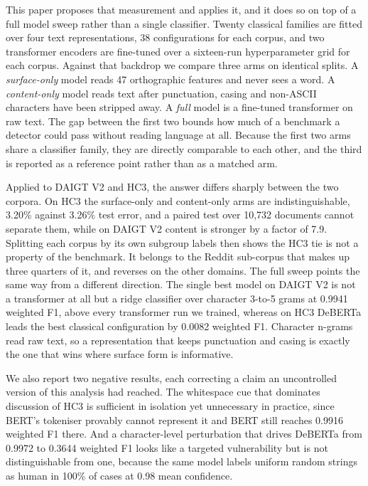 \documentclass[conference,a4paper]{IEEEtran}
\begin{document}
This paper proposes that measurement and applies it, and it does so on top of a full model sweep rather than a single classifier. Twenty classical families are fitted over four text representations, 38 configurations for each corpus, and two transformer encoders are fine-tuned over a sixteen-run hyperparameter grid for each corpus. Against that backdrop we compare three arms on identical splits. A \emph{surface-only} model reads 47 orthographic features and never sees a word. A \emph{content-only} model reads text after punctuation, casing and non-ASCII characters have been stripped away. A \emph{full} model is a fine-tuned transformer on raw text. The gap between the first two bounds how much of a benchmark a detector could pass without reading language at all. Because the first two arms share a classifier family, they are directly comparable to each other, and the third is reported as a reference point rather than as a matched arm.

Applied to DAIGT V2 and HC3, the answer differs sharply between the two corpora. On HC3 the surface-only and content-only arms are indistinguishable, 3.20\% against 3.26\% test error, and a paired test over 10,732 documents cannot separate them, while on DAIGT V2 content is stronger by a factor of 7.9. Splitting each corpus by its own subgroup labels then shows the HC3 tie is not a property of the benchmark. It belongs to the Reddit sub-corpus that makes up three quarters of it, and reverses on the other domains. The full sweep points the same way from a different direction. The single best model on DAIGT V2 is not a transformer at all but a ridge classifier over character 3-to-5 grams at 0.9941 weighted F1, above every transformer run we trained, whereas on HC3 DeBERTa leads the best classical configuration by 0.0082 weighted F1. Character n-grams read raw text, so a representation that keeps punctuation and casing is exactly the one that wins where surface form is informative.

We also report two negative results, each correcting a claim an uncontrolled version of this analysis had reached. The whitespace cue that dominates discussion of HC3 is sufficient in isolation yet unnecessary in practice, since BERT's tokeniser provably cannot represent it and BERT still reaches 0.9916 weighted F1 there. And a character-level perturbation that drives DeBERTa from 0.9972 to 0.3644 weighted F1 looks like a targeted vulnerability but is not distinguishable from one, because the same model labels uniform random strings as human in 100\% of cases at 0.98 mean confidence.
\end{document}
